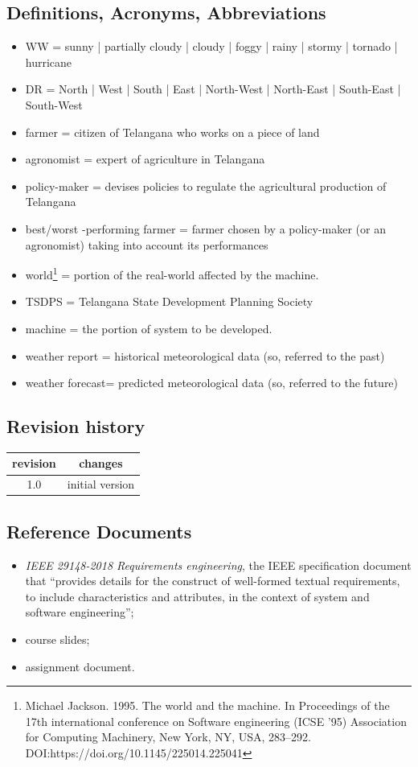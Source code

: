 \documentclass{article}
\begin{document}
\subsection{Definitions, Acronyms, Abbreviations}\label{Abbreviations}
\begin{itemize}
    \item WW = sunny | partially cloudy |  cloudy | foggy  |  rainy | stormy | tornado | hurricane
    \item DR = North | West | South | East | North-West | North-East | South-East | South-West 
    \item farmer = citizen of Telangana who works on a piece of land
    \item agronomist = expert of agriculture in Telangana
    \item policy-maker = devises policies to regulate the agricultural
production of Telangana
    \item best/worst -performing farmer = farmer chosen by a policy-maker (or an agronomist) taking into account its performances
    \item world\footnote{{Michael Jackson. 1995. The world and the machine. In Proceedings of the 17th international conference on Software engineering (ICSE '95) Association for
Computing Machinery, New York, NY, USA, 283–292.
DOI:https://doi.org/10.1145/225014.225041}} = portion of the real-world
affected by the machine.
\item TSDPS = Telangana State Development Planning Society
\item machine = the portion of system to be developed.
\item weather report = historical meteorological data (so, referred to the past)
\item weather forecast= predicted meteorological data (so, referred to the future)
\end{itemize}
\subsection{Revision history}
\begin{left}
\begin{tabular}{ |c | c |}
\hline
 revision & changes \\ 
 \hline
 1.0 &  initial version\\ 
 \hline
\end{tabular}
\end{left}
\subsection{Reference Documents}
\begin{itemize}
\item \textit{IEEE 29148-2018 Requirements engineering}, the IEEE specification document that “provides details for the construct of well-formed textual requirements, to include characteristics and attributes, in the context of system and software engineering”;
\item course slides;
\item assignment document.
\end{itemize}
\end{document}

